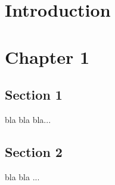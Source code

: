 \chapter*{Introduction}

\newpage

\chapter{Chapter 1}
\minitoc
\section{Section 1}

\noindent bla bla bla...

\newpage

\section{Section 2}

\noindent bla bla ...